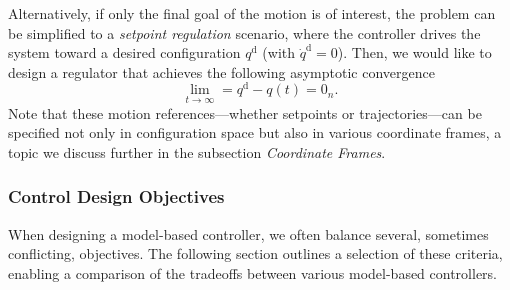 Alternatively, if only the final goal of the motion is of interest, the problem can be simplified to a \emph{setpoint regulation} scenario, where the controller drives the system toward a desired configuration $q^\mathrm{d}$ (with $\dot{q}^\mathrm{d} = 0$).
Then, we would like to design a regulator that achieves the following asymptotic convergence
\begin{equation}
    \lim_{t \to \infty} = q^\mathrm{d} - q(t) = 0_n.
\end{equation}
Note that these motion references—whether setpoints or trajectories—can be specified not only in configuration space but also in various coordinate frames, a topic we discuss further in the subsection \emph{Coordinate Frames}.

\subsubsection{Control Design Objectives}
When designing a model-based controller, we often balance several, sometimes conflicting, objectives. The following section outlines a selection of these criteria, enabling a comparison of the tradeoffs between various model-based controllers.

